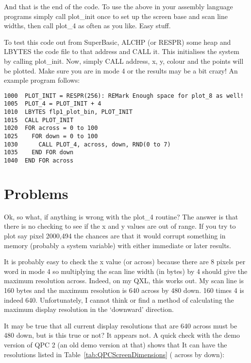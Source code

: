 And that is the end of the code. To use the above in your assembly
    language programs simply call plot\_init once to set up the screen base and
    scan line widths, then call plot\_4 as often as you like. Easy
    stuff.

To test this code out from SuperBasic, ALCHP (or RESPR) some heap
    and LBYTES the code file to that address and CALL it. This initialises the
    system by calling plot\_init. Now, simply CALL address, x, y, colour and
    the points will be plotted. Make sure you are in mode 4 or the results may
    be a bit crazy! An example program follows:

\begin{lstlisting}[firstnumber=1,]
1000  PLOT_INIT = RESPR(256): REMark Enough space for plot_8 as well!
1005  PLOT_4 = PLOT_INIT + 4
1010  LBYTES flp1_plot_bin, PLOT_INIT
1015  CALL PLOT_INIT
1020  FOR across = 0 to 100
1025    FOR down = 0 to 100
1030      CALL PLOT_4, across, down, RND(0 to 7)
1035    END FOR down
1040  END FOR across
\end{lstlisting}

\section{Problems}
\label{ch8-problems}%

Ok, so what, if anything is wrong with the plot\_4 routine? The
    answer is that there is no checking to see if the x and y values are out
    of range. If you try to plot say pixel 2000,494 the chances are that it
    would corrupt something in memory (probably a system variable) with either
    immediate or later results.

It is probably easy to check the x value (or across) because there
    are 8 pixels per word in mode 4 so multiplying the scan line width (in
    bytes) by 4 should give the maximum resolution across. Indeed, on my QXL,
    this works out. My scan line is 160 bytes and the maximum resolution is
    640 across by 480 down. 160 times 4 is indeed 640. Unfortunately, I cannot
    think or find a method of calculating the maximum display resolution in
    the `downward' direction.

It may be true that all current display resolutions that are 640
    across must be 480 down, but is this true or not? It appears not. A quick
    check with the demo version of QPC 2 (an old demo version at that) shows
    that It can have the resolutions listed in Table~\ref{tab:QPCScreenDimensions} ( across by down):

